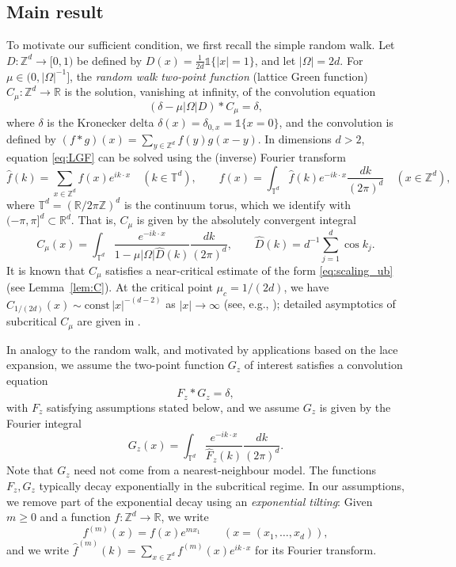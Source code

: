 \documentclass[11pt,hidelinks]{article}
\theoremstyle{plain}
\numberwithin{equation}{section}
\newcommand{\Z}{\mathbb{Z}}
\newcommand{\R}{\mathbb{R}}
\newcommand{\T}{\mathbb{T}}
\newcommand{\inv}{^{-1}}
\renewcommand{\(}{\left(}
\renewcommand{\)}{\right)}
\newcommand{\1}{\mathds{1}}
\providecommand{\abs}[1]{\lvert#1\rvert}
\newcommand{\supm}{^{(m)}}
\newcommand{\const}{\mathrm{const}}
\newcommand{\Dnn}{D}
\begin{document}
\subsection{Main result}

To motivate our sufficient condition, we first recall the simple random walk.
Let $\Dnn: \Z^d \to [0,1)$ be defined by $\Dnn(x) = \frac{1}{2d} \1\{|x|=1\}$, and let $\abs\Omega = 2d$. 
For $\mu \in (0,\abs\Omega\inv]$, the \emph{random walk two-point function} (lattice Green function)
$C_\mu : \Z^d \to \R$ is the solution, vanishing at infinity, of the convolution equation
\begin{equation}
\label{eq:LGF}
    (\delta -\mu\abs\Omega \Dnn)*C_\mu = \delta ,
\end{equation}
where $\delta$ is the Kronecker delta $\delta(x)=\delta_{0,x} = \1\{x=0\}$,
and the convolution is defined by $(f*g)(x) = \sum_{y\in \Z^d} f(y)g(x-y)$.
In dimensions $d > 2$,
equation \eqref{eq:LGF} can be solved using the (inverse) Fourier transform
\begin{equation}
\hat f(k)  = \sum_{x\in\Z^d}f(x) e^{ik\cdot x} 	\quad (k \in \T^d),
\qquad
f(x) = \int_{\T^d} \hat f(k) e^{-ik\cdot x}  \frac{ dk }{ (2\pi)^d } \quad (x\in \Z^d),
\end{equation}
where $\T^d=(\R/2\pi\Z)^d$ is the continuum torus, which we identify with $(-\pi,\pi]^d \subset \R^d$.
That is, $C_\mu$ is given by the absolutely convergent integral
\begin{equation}
C_\mu(x) 
= \int_{\T^d} \frac{ e^{-ik\cdot x} }{1 - \mu\abs\Omega\hat \Dnn(k)} \frac{ dk }{ (2\pi)^d },
	\qquad  \hat \Dnn(k) = d^{-1}\sum_{j=1}^d \cos k_j.
\end{equation}
It is known that $C_\mu$ satisfies a near-critical estimate of the form \eqref{eq:scaling_ub} (see Lemma~\ref{lem:C}).
At the critical point $\mu_c = 1/(2d)$, we have $C_{1/(2d)}(x) \sim \const\, \abs x^{-(d-2)}$ as $\abs x\to \infty$ (see, e.g., \cite{LL10});
detailed asymptotics of subcritical $C_\mu$ are given in \cite{MS22}. 


In analogy to the random walk, and motivated by applications based on the lace expansion, we assume the two-point function $G_z$ of interest satisfies a convolution equation
\begin{equation} \label{eq:FGz}
F_z * G_z = \delta,
\end{equation}
with $F_z$ satisfying assumptions stated below, 
and we assume $G_z$ is given by the Fourier integral
\begin{equation} \label{eq:Gint}
G_z(x) = \int_{\T^d} \frac{ e^{-ik\cdot x} }{ \hat F_z(k) } \frac{dk}{(2\pi)^d}.
\end{equation}
Note that $G_z$ need not come from a nearest-neighbour model.
The functions $F_z, G_z$ typically decay exponentially in the subcritical regime. In our assumptions, we remove part of the exponential decay using an \emph{exponential tilting}: 
Given $m\ge 0$ and a function $f : \Z^d \to \R$, we write
\begin{equation}
f\supm(x) = f(x)e^{mx_1} 	\qquad (x = (x_1, \dots, x_d)),
\end{equation}
and we write $\hat f \supm(k) = \sum_{x\in \Z^d} f\supm(x) e^{ik\cdot x}$ for its Fourier transform.
\end{document}
